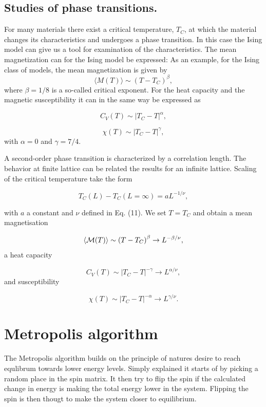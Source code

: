 \documentclass[twoside,twocolumn]{article}
\begin{document}
\subsection{Studies of phase transitions.}


For many materials there exist a critical temperature, $T_C$, at which the material changes its characteristics and undergoes a phase transition. In this case the Ising model can give us a tool for examination of the characteristics. The mean magnetization can for the Ising model be expressed:
As an example, for the Ising class of models, 
the mean magnetization is given by
\[
  \langle M(T) \rangle \sim \left(T-T_C\right)^{\beta},
\]
where $\beta=1/8$ is a so-called critical exponent. For the heat capacity and the magnetic susceptibility  it can in the same way be expressed as

\[
  C_V(T) \sim \left|T_C-T\right|^{\alpha},
\]

\begin{equation}
  \chi(T) \sim \left|T_C-T\right|^{\gamma},
\end{equation}
with $\alpha = 0$ and $\gamma = 7/4$.

A second-order phase transition is characterized by a
correlation length. The behavior at finite lattice can be related the results for an infinite lattice. Scaling of the critical temperature take the form


\begin{equation}
 T_C(L)-T_C(L=\infty) = aL^{-1/\nu},
 \label{eq:tc}
\end{equation}

with  $a$ a constant and  $\nu$ defined in Eq. (11). 
We set $T=T_C$ and obtain a mean magnetisation

\begin{equation}
  \langle {\cal M}(T) \rangle \sim \left(T-T_C\right)^{\beta}
  \rightarrow L^{-\beta/\nu},
  \label{eq:scale1}
\end{equation}
a heat capacity

\begin{equation}
  C_V(T) \sim \left|T_C-T\right|^{-\gamma} \rightarrow L^{\alpha/\nu},
  \label{eq:scale2}
\end{equation}
and susceptibility

\begin{equation}
  \chi(T) \sim \left|T_C-T\right|^{-\alpha} \rightarrow L^{\gamma/\nu}.
  \label{eq:scale3}
\end{equation}
\section{Metropolis algorithm}
The Metropolis algorithm builds on the principle of natures desire to reach equlibrum towards lower energy levels. Simply explained it starts of by picking a random place in the spin matrix. It then try to flip the spin if the calculated change in energy is making the total energy lower in the system. Flipping the spin is then thougt to make the system closer to equilibrium.
\end{document}
